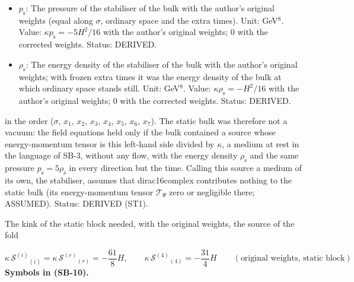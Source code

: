 \documentclass[
  10pt,
]{article}
\begin{document}
\begin{itemize}
  static bulk of the author's metric required with the author's original
  Lovelock weights, found and named by Claude (Anthropic) on 2026-10-24;
  with the corrected weights and \(\Lambda = -7H^2\) it is zero (IN-7).
  Unit: GeV\(^8\). Value: 0 with the corrected weights. Status: DERIVED.
\item
  \(p_{\mathrm{s}}\): The pressure of the stabiliser of the bulk with
  the author's original weights (equal along \(\sigma\), ordinary space
  and the extra times). Unit: GeV\(^8\). Value:
  \(\kappa p_{\mathrm{s}} = -5H^2/16\) with the author's original
  weights; 0 with the corrected weights. Status: DERIVED.
\item
  \(\rho_{\mathrm{s}}\): The energy density of the stabiliser of the
  bulk with the author's original weights; with frozen extra times it
  was the energy density of the bulk at which ordinary space stands
  still. Unit: GeV\(^8\). Value: \(\kappa\rho_{\mathrm{s}} = -H^2/16\)
  with the author's original weights; 0 with the corrected weights.
  Status: DERIVED.
\end{itemize}

in the order (\(\sigma\), \(x_1\), \(x_2\), \(x_3\), \(x_4\), \(x_5\),
\(x_6\), \(x_7\)). The static bulk was therefore not a vacuum: the field
equations held only if the bulk contained a source whose energy-momentum
tensor is this left-hand side divided by \(\kappa\), a medium at rest in
the language of SB-3, without any flow, with the energy density
\(\rho_{\mathrm{s}}\) and the same pressure
\(p_{\mathrm{s}} = 5\rho_{\mathrm{s}}\) in every direction but the time.
Calling this source a medium of its own, the stabiliser, assumes that
dirac16complex contributes nothing to the static bulk (its
energy-momentum tensor \(\mathcal{T}_\Psi\) zero or negligible there;
ASSUMED). Status: DERIVED (ST1).

The kink of the static block needed, with the original weights, the
source of the fold

\[
\kappa\,\mathcal{S}^{(i)}{}_{(i)} = \kappa\,\mathcal{S}^{(r)}{}_{(r)} = -\frac{61}{8}H,\qquad
\kappa\,\mathcal{S}^{(4)}{}_{(4)} = -\frac{31}{4}H\qquad(\text{original weights, static block}) \tag{SB-10}
\] \textbf{Symbols in (SB-10).}
\end{document}
